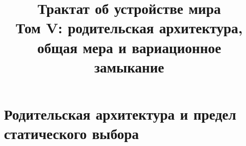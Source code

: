 \documentclass[12pt,a4paper]{report}
\title{Трактат об устройстве мира\\
Том V: родительская архитектура, общая мера и вариационное замыкание}
\author{}
\date{}
\theoremstyle{remark}
\begin{document}
\hypersetup{pageanchor=false}
\maketitle
\clearpage
\hypersetup{pageanchor=true}
\setcounter{page}{1}
\tableofcontents
\clearpage
{}

\part{Родительская архитектура и предел статического выбора}





































\end{document}
